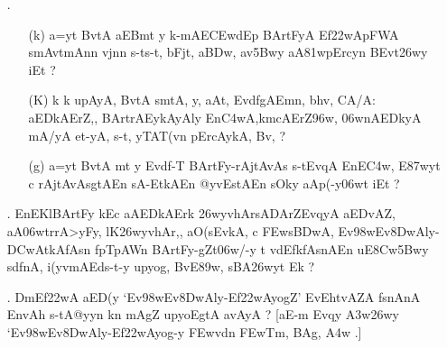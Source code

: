 \def\DevnagVersion{2.15}\documentclass{article}
\begin{document}
\begin{itemize}
\begin{itemize}
                      \item[({\dn g})] {\dn E\392wtFy-yA\2 pA\3D1wvEq\0\3C8wA\2 yojnAyA\2 s\2-tEf\322wAyA, aEBvD\0nAy k\? upAyA, Bv\306wmt\? avlMbnFyA, .}
                      \end{itemize} 

\item[{\dn \dnnum \rn{4}}.] \begin{itemize}
				\item[({\dn k})] {\dn a=y\?t BvtA aEBmt\2 y k-mAE\3CEwdEp  BArtFyA\qq{t} Ef\322wApFWA smAvt\0mAn\?n vjn\?n s\2-\9{k}ts\2-t\?, bFjt\4, a\3BDw\4, av\35Bwy aA\381wpErcy\?n BEvt\326wy iEt {\rs ?\re}}
                
                \item[({\dn K})] {\dn k\? k\? upAyA, BvtA\2 s\2mtA, y\4, aAt\4, Evd\?fgAEmn, bhv, CA/A{\rs :\re} aEDkAErZ,{\rs ,\re} BArtrAEykAyA\0ly\? En\3C4wA,km\0cAErZ\396w{\rs ,\re} \306wnAEDkyA mA/yA et-yA, s\2-t\?, yTAT\0(v\?n pErcAykA, Bv\?, {\rs ?\re}}
                
                \item[({\dn g})] {\dn a=y\?t BvtA\2 mt y Evd\?f-T\? BArtFy{\rs -\re}rAjtAvAs\? s\2-tEvqA\2 EnE\3C4w, E\387wyt\? c\? rAjtAvAsgtAEn sA\2-EtkAEn @yvEstAEn sOky\0 aAp(-y\306wt\? iEt {\rs ?\re}}
           \end{itemize} 
           
 \item[{\dn \dnnum \rn{5}}.]  {\dn EnEKlBArtFy\? k\?Ec aAEDkAErk\? \326wyvhAr\?sADArZEvqyA aEDvA\0Z, aA\306wtrrA>yFy, l\?K\326wyvhAr,{\rs ,\re} aO(sEvkA, c \3FEws\3BDwA, Ev\398wEv\38DwAly{\rs -\re}\3DCwAtkAfAsn fpTpAWn BArtFy{\rs -\re}gZt\306w/-y t\? v\4d\?EfkfAsnAEn uE\38Cw\35Bwy s\2d\?fnA{\rs ,\re} i(y\?vmAEds\2-t-y upyog, BvE\389w, s\2BA\326wyt\? Ek {\rs ?\re}}
 
 \item[{\dn \dnnum \rn{6}}.] {Dm\0Ef\322wA aED(y {\rs `\re}Ev\398wEv\38DwAly{\rs -\re}Ef\322wAyog\?Z{\rs '\re} EvEhtvA\0ZA\2 f\2snAnA\2 EnvA\0h\?{\rs ,\re} s\2-tA@yyn\2 k\?n mAg\?{\qvb}Z upyoEgtA avAyA {\rs ?\re} {\rs [\re}aE-m Evqy\? \3A3w\326wy {\rs `\re}Ev\398wEv\38DwAly{\rs -\re}Ef\322wAyog-y \3FEwv\?dn \3FEwTm, BAg, {\dnnum {} \3A4w  .}{\rs ]\re}}   
 

\end{itemize}
\end{document}
